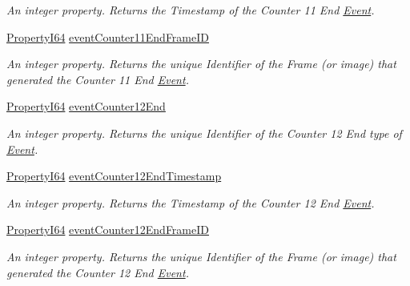 \begin{DoxyCompactItemize}
\begin{DoxyCompactList}\small\item\em An integer property. Returns the Timestamp of the Counter 11 End \hyperlink{classmv_i_m_p_a_c_t_1_1acquire_1_1_event}{Event}. \end{DoxyCompactList}\item 
\hyperlink{group___common_interface_ga81749b2696755513663492664a18a893}{Property\+I64} \hyperlink{classmv_i_m_p_a_c_t_1_1acquire_1_1_gen_i_cam_1_1_event_control_a4ec3d07be49576c3ad03cb7a94d2325f}{event\+Counter11\+End\+Frame\+I\+D}
\begin{DoxyCompactList}\small\item\em An integer property. Returns the unique Identifier of the Frame (or image) that generated the Counter 11 End \hyperlink{classmv_i_m_p_a_c_t_1_1acquire_1_1_event}{Event}. \end{DoxyCompactList}\item 
\hyperlink{group___common_interface_ga81749b2696755513663492664a18a893}{Property\+I64} \hyperlink{classmv_i_m_p_a_c_t_1_1acquire_1_1_gen_i_cam_1_1_event_control_a4dcbb2cec3b11f195dcda2822271ad49}{event\+Counter12\+End}
\begin{DoxyCompactList}\small\item\em An integer property. Returns the unique Identifier of the Counter 12 End type of \hyperlink{classmv_i_m_p_a_c_t_1_1acquire_1_1_event}{Event}. \end{DoxyCompactList}\item 
\hyperlink{group___common_interface_ga81749b2696755513663492664a18a893}{Property\+I64} \hyperlink{classmv_i_m_p_a_c_t_1_1acquire_1_1_gen_i_cam_1_1_event_control_a3872ff085db5a2cc797ee0a6c0d5605c}{event\+Counter12\+End\+Timestamp}
\begin{DoxyCompactList}\small\item\em An integer property. Returns the Timestamp of the Counter 12 End \hyperlink{classmv_i_m_p_a_c_t_1_1acquire_1_1_event}{Event}. \end{DoxyCompactList}\item 
\hyperlink{group___common_interface_ga81749b2696755513663492664a18a893}{Property\+I64} \hyperlink{classmv_i_m_p_a_c_t_1_1acquire_1_1_gen_i_cam_1_1_event_control_a75174ec72806035e470e10b255b12915}{event\+Counter12\+End\+Frame\+I\+D}
\begin{DoxyCompactList}\small\item\em An integer property. Returns the unique Identifier of the Frame (or image) that generated the Counter 12 End \hyperlink{classmv_i_m_p_a_c_t_1_1acquire_1_1_event}{Event}. \end{DoxyCompactList}\item 

\end{DoxyCompactItemize}
